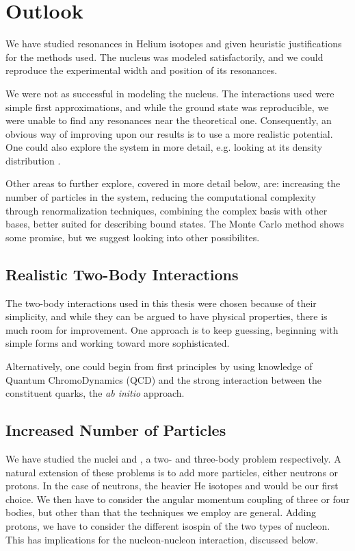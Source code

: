 \documentclass[../main/report.tex]{subfiles}
\begin{document}
\chapter{Outlook}
\label{cha:outlook}


We have studied resonances in Helium isotopes and given heuristic justifications for the methods used. The  nucleus was modeled satisfactorily, and we could reproduce the experimental width and position of its resonances. 

We were not as successful in modeling the  nucleus. The interactions used were simple first approximations, and while the ground state was reproducible, we were unable to find any resonances near the theoretical one. Consequently, an obvious way of improving upon our results is to use a more realistic potential. One could also explore the  system in more detail, e.g. looking at its density distribution \cite{radii}.

Other areas to further explore, covered in more detail below, are: increasing the number of particles in the system, reducing the computational complexity through renormalization techniques, combining the complex basis with other bases, better suited for describing bound states.
The Monte Carlo method shows some promise, but we suggest looking into other possibilites.

\section{Realistic Two-Body Interactions}
The two-body interactions used in this thesis were chosen because of their simplicity, and while they can be argued to have physical properties, there is much room for improvement. One approach is to keep guessing, beginning with simple forms and working toward more sophisticated.

Alternatively, one could begin from first principles by using knowledge of Quantum ChromoDynamics (QCD) and the strong interaction between the constituent quarks, the \emph{ab initio} approach.

\section{Increased Number of Particles}

We have studied the nuclei  and , a two- and three-body problem respectively. 
A natural extension of these problems is to add more particles, either neutrons or protons.
In the case of neutrons, the heavier He isotopes  and  would be our first choice.
We then have to consider the angular momentum coupling of three or four bodies, but other than that the techniques we employ are general.
Adding protons, we have to consider the different isospin of the two types of nucleon.
This has implications for the nucleon-nucleon interaction, discussed below.
\end{document}
